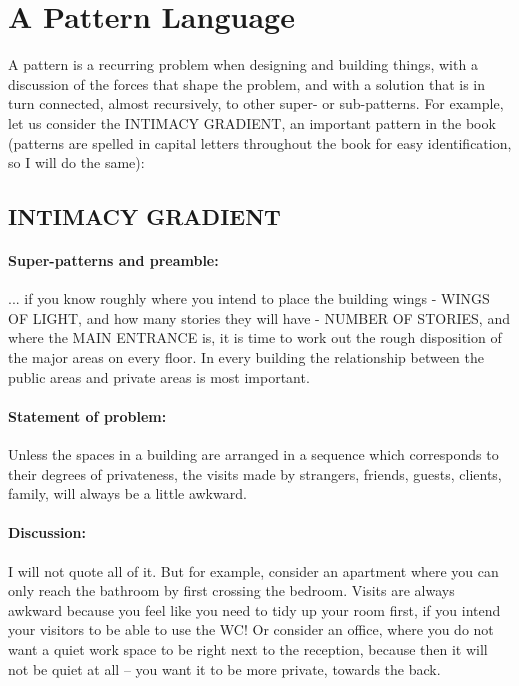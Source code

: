 \section*{A Pattern Language}

A pattern is a recurring problem when designing and building things, with a
discussion of the forces that shape the problem, and with a solution that is in
turn connected, almost recursively, to other super- or sub-patterns. For
example, let us consider the INTIMACY GRADIENT, an important pattern in the book
(patterns are spelled in capital letters throughout the book for easy
identification, so I will do the same):

\subsection*{INTIMACY GRADIENT}

\paragraph*{Super-patterns and preamble:}
... if you know roughly where you intend to place the building wings - WINGS OF
LIGHT, and how many stories they will have - NUMBER OF STORIES, and where the
MAIN ENTRANCE is, it is time to work out the rough disposition of the major
areas on every floor. In every building the relationship between the public
areas and private areas is most important.

\paragraph*{Statement of problem:}
Unless the spaces in a building are arranged in a sequence which corresponds to
their degrees of privateness, the visits made by strangers, friends, guests,
clients, family, will always be a little awkward.

\paragraph*{Discussion:}
I will not quote all of it. But for example, consider an apartment where you can
only reach the bathroom by first crossing the bedroom. Visits are always awkward
because you feel like you need to tidy up your room first, if you intend your
visitors to be able to use the WC! Or consider an office, where you do not want
a quiet work space to be right next to the reception, because then it will not
be quiet at all -- you want it to be more private, towards the back.

